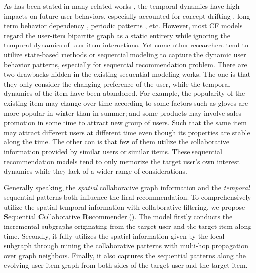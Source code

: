 
As has been stated in many related works \cite{hidasi2017recurrent,koren2009collaborative,he2016vista,agarwal2009spatio}, the temporal dynamics have high impacts on future user behaviors, especially accounted for concept drifting \cite{widmer1996learning}, long-term behavior dependency \cite{koren2009collaborative}, periodic patterns \cite{ren2018repeatnet}, etc.
However, most CF models regard the user-item bipartite graph as a static entirety while ignoring the temporal dynamics of user-item interactions.
Yet some other researchers tend to utilize state-based methods \cite{he2016fusing,he2016vista} or sequential modeling \cite{hidasi2017recurrent,tang2018personalized,ren2019lifelong} to capture the dynamic user behavior patterns, especially for sequential recommendation \cite{huang2018improving,chen2018sequential,kang2018self,tang2018personalized} problem.
There are two drawbacks hidden in the existing sequential modeling works.
The one is that they only consider the changing preference of the user, while the temporal dynamics of the item have been abandoned.
For example, the popularity of the existing item may change over time \cite{koren2009collaborative} according to some factors such as gloves are more popular in winter than in summer; and some products may involve sales promotion in some time to attract new group of users. %
Such that the same item may attract different users at different time even though its properties are stable along the time.
The other con is that few of them utilize the collaborative information provided by similar users or similar items. These sequential recommendation models tend to only memorize the target user's own interest dynamics while they lack of a wider range of considerations.


Generally speaking, the \textit{spatial} collaborative graph information and the \textit{temporal} sequential patterns both influence the final recommendation.
To comprehensively utilize the spatial-temporal information with collaborative filtering, we propose \textbf{S}equential \textbf{Co}llaborative \textbf{Re}commender (\score).
The model firstly conducts the incremental subgraphs originating from the target user and the target item along time.
Secondly, it fully utilizes the spatial information given by the local subgraph through mining the collaborative patterns with multi-hop propagation over graph neighbors.
Finally, it also captures the sequential patterns along the evolving user-item graph from both sides of the target user and the target item.%

